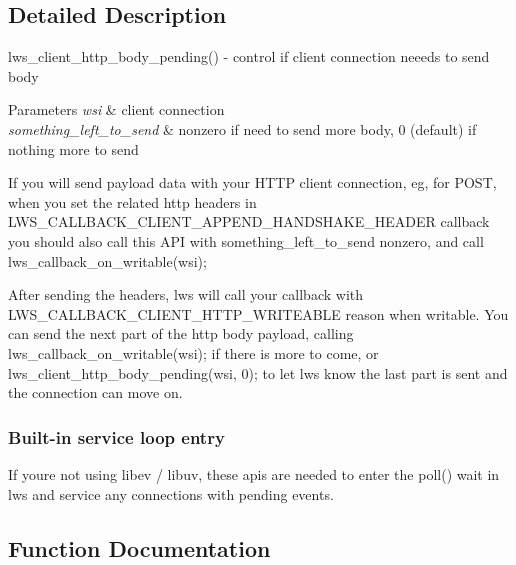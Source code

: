 \subsection{Detailed Description}
lws\+\_\+client\+\_\+http\+\_\+body\+\_\+pending() -\/ control if client connection neeeds to send body


\begin{DoxyParams}{Parameters}
{\em wsi} & client connection \\
\hline
{\em something\+\_\+left\+\_\+to\+\_\+send} & nonzero if need to send more body, 0 (default) if nothing more to send\\
\hline
\end{DoxyParams}
If you will send payload data with your H\+T\+TP client connection, eg, for P\+O\+ST, when you set the related http headers in L\+W\+S\+\_\+\+C\+A\+L\+L\+B\+A\+C\+K\+\_\+\+C\+L\+I\+E\+N\+T\+\_\+\+A\+P\+P\+E\+N\+D\+\_\+\+H\+A\+N\+D\+S\+H\+A\+K\+E\+\_\+\+H\+E\+A\+D\+ER callback you should also call this A\+PI with something\+\_\+left\+\_\+to\+\_\+send nonzero, and call lws\+\_\+callback\+\_\+on\+\_\+writable(wsi);

After sending the headers, lws will call your callback with L\+W\+S\+\_\+\+C\+A\+L\+L\+B\+A\+C\+K\+\_\+\+C\+L\+I\+E\+N\+T\+\_\+\+H\+T\+T\+P\+\_\+\+W\+R\+I\+T\+E\+A\+B\+LE reason when writable. You can send the next part of the http body payload, calling lws\+\_\+callback\+\_\+on\+\_\+writable(wsi); if there is more to come, or lws\+\_\+client\+\_\+http\+\_\+body\+\_\+pending(wsi, 0); to let lws know the last part is sent and the connection can move on.

\subsubsection*{Built-\/in service loop entry}

If you\textquotesingle{}re not using libev / libuv, these apis are needed to enter the poll() wait in lws and service any connections with pending events. 

\subsection{Function Documentation}
\mbox{\label{group__service_ga53e3d0801dfda7960a7249dd559e68a2}} 
